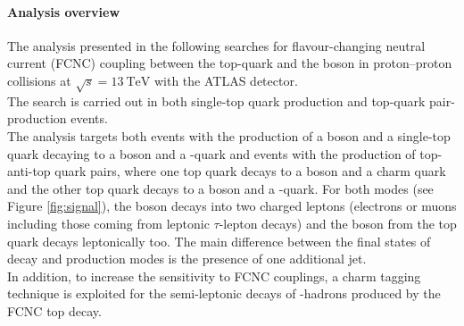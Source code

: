 \paragraph{Analysis overview}
The analysis presented in the following searches for flavour-changing
neutral current (FCNC) coupling between the top-quark and the \PZ
boson in proton--proton collisions at $\sqrt{s} = \SI{13}{\TeV}$ with
the ATLAS detector. \\
The search is carried out in both single-top quark production and
top-quark pair-production events.\\
The analysis targets both events with the production of a \PZ boson and a single-top quark decaying to a \PW boson and a \Pqb-quark and events with the production of top-anti-top quark pairs, where one top quark decays to a \PZ boson and a charm quark and the other top quark decays to a \PW boson and a \Pqb-quark. For both modes (see Figure \ref{fig:signal}), the \PZ boson decays into two charged leptons (electrons or muons including those coming from leptonic $\tau$-lepton decays) and the \PW boson from the top quark decays leptonically too. 
The main difference between the final states of decay and production modes is the presence of one additional jet. \\
In addition, to increase the sensitivity to FCNC \tZc couplings, 
a charm tagging technique is exploited for
the semi-leptonic decays of \Pqc-hadrons produced by the FCNC top
decay. 

